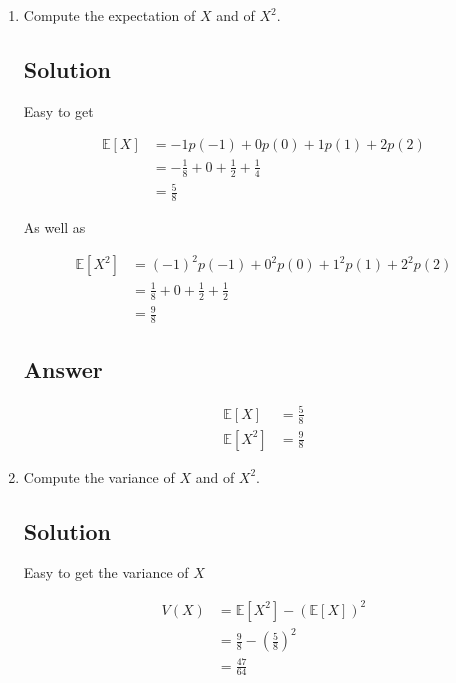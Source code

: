 \documentclass[12pt]{article}
\newcommand{\bE}{\mathbb{E}}
\begin{document}
	\begin{enumerate}[start=1,label={\bfseries Part \arabic*:},leftmargin=0in]
		\bigskip\item Compute the expectation of $X$ and of $X^2$.
		
		\subsection*{Solution}
		
			Easy to get
		
			\[
				\begin{aligned}
					\bE[X] &= -1p(-1) + 0p(0) + 1p(1) + 2p(2)\\
					&= -\frac{1}{8} + 0 + \frac{1}{2} + \frac{1}{4}\\
					&= \frac{5}{8}
				\end{aligned}
			\]
			
			As well as
			
			\[
			\begin{aligned}
				\bE\left[X^2\right] &= (-1)^2p(-1) + 0^2p(0) + 1^2p(1) + 2^2p(2)\\
				&= \frac{1}{8} + 0 + \frac{1}{2} + \frac{1}{2}\\
				&= \frac{9}{8}
			\end{aligned}
			\]
		
		\subsection*{Answer}
		
			\[\boxed{\begin{aligned}
					\bE[X] &= \frac{5}{8}\\
					\bE\left[X^2\right] &= \frac{9}{8}
			\end{aligned}}\]
		
		\bigskip\item Compute the variance of $X$ and of $X^2$.
		
		\subsection*{Solution}
		
			Easy to get the variance of $X$
			
			\[
				\begin{aligned}
					V(X) &= \bE\left[X^2\right] - (\bE[X])^2\\
					&= \frac{9}{8} - \left(\frac{5}{8}\right)^2\\
					&= \frac{47}{64}
				\end{aligned}
			\]
			

\end{enumerate}
\end{document}
